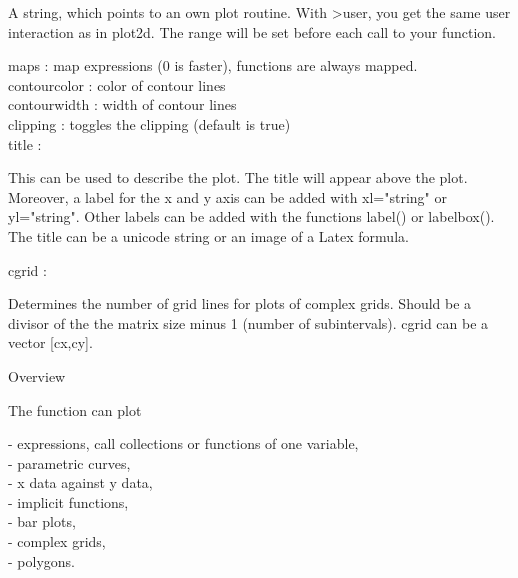 \documentclass{article}
\begin{document}
\begin{eulernotebook}
\begin{eulercomment}
\begin{eulercomment}
\begin{eulercomment}
\begin{eulercomment}
\begin{eulercomment}
\begin{eulercomment}
\begin{eulercomment}
\begin{eulercomment}
\begin{eulerttcomment}
  A string, which points to an own plot routine. With >user, you get
  the same user interaction as in plot2d. The range will be set
  before each call to your function.
\end{eulerttcomment}
\begin{eulercomment}
maps      : map expressions (0 is faster), functions are always mapped.\\
contourcolor : color of contour lines\\
contourwidth : width of contour lines\\
clipping  : toggles the clipping (default is true)\\
title     :\\
\end{eulercomment}
\begin{eulerttcomment}
  This can be used to describe the plot. The title will appear above
  the plot. Moreover, a label for the x and y axis can be added with
  xl="string" or yl="string". Other labels can be added with the
  functions label() or labelbox(). The title can be a unicode
  string or an image of a Latex formula.
\end{eulerttcomment}
\begin{eulercomment}
cgrid     :\\
\end{eulercomment}
\begin{eulerttcomment}
  Determines the number of grid lines for plots of complex grids.
  Should be a divisor of the the matrix size minus 1 (number of
  subintervals). cgrid can be a vector [cx,cy].
\end{eulerttcomment}
\begin{eulercomment}

Overview

The function can plot

- expressions, call collections or functions of one variable,\\
- parametric curves,\\
- x data against y data,\\
- implicit functions,\\
- bar plots,\\
- complex grids,\\
- polygons.


\end{eulercomment}
\end{eulercomment}
\end{eulercomment}
\end{eulercomment}
\end{eulercomment}
\end{eulercomment}
\end{eulercomment}
\end{eulercomment}
\end{eulercomment}
\end{eulernotebook}
\end{document}
